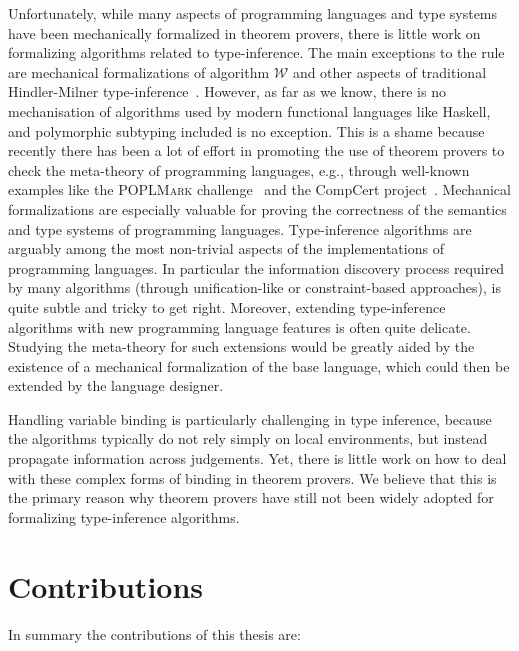 Unfortunately, while many aspects of programming languages and type systems
have been mechanically formalized in theorem provers, there is little work on
formalizing algorithms related to type-inference. The main exceptions to the rule
are mechanical formalizations of algorithm $\mathcal{W}$ and other aspects
of traditional Hindler-Milner 
type-inference~\cite{naraschewski1999type,dubois2000proving,dubois1999certification,urban2008nominal,garrigue2015certified}.
However, as far as we know, there is no mechanisation of algorithms 
used by modern functional languages like Haskell, and
polymorphic subtyping included is no exception.  
This is a shame because recently there has been a lot of effort
in promoting the use of theorem provers to check the meta-theory 
of programming languages, e.g., through well-known examples like the \textsc{POPLMark} challenge~\cite{aydemir2005mechanized} and the CompCert project~\cite{leroy2012compcert}.
Mechanical formalizations are especially valuable for proving the
correctness of the semantics and type systems 
of programming languages. Type-inference algorithms are arguably among
the most non-trivial aspects of the implementations of programming
languages. In particular the information discovery process required by 
many algorithms (through unification-like or constraint-based
approaches), is quite subtle and tricky to get right. Moreover,
extending type-inference algorithms with new programming language features is often quite 
delicate. Studying the meta-theory for such extensions would be
greatly aided by the existence of a mechanical
formalization of the base language, which could then be extended by
the language designer.

Handling variable binding is particularly challenging in type inference,
because the algorithms typically do not rely simply on local environments, but
instead propagate information across judgements. Yet, there is little work on
how to deal with these complex forms of binding in theorem provers. We believe
that this is the primary reason why theorem provers have still not been widely
adopted for formalizing type-inference algorithms.



\section{Contributions}

In summary the contributions of this thesis are:


